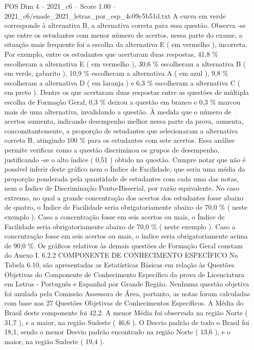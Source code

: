 \begin{textsample}{POS Dim 4 – 2021\_c6 – Score 1.00 – 2021\_c6/enade\_2021\_letras\_por\_esp\_4c09c5b51d.txt}
A curva em verde corresponde à alternativa B, a alternativa correta para essa questão.
Observa -se que entre os estudantes com menor número de acertos, nessa parte do exame, a situação mais frequente foi a escolha da alternativa E ( em vermelho ), incorreta.
Por exemplo, entre os estudantes que acertaram duas respostas, 41,8 \% escolheram a alternativa E ( em vermelho ), 30,6 \% escolheram a alternativa B ( em verde, gabarito ), 10,9 \% escolheram a alternativa A ( em azul ), 9,8 \% escolheram a alternativa D ( em laranja ) e 6,3 \% escolheram a alternativa C ( em preto ).
Dentre os que acertaram duas respostas entre as questões de múltipla escolha de Formação Geral, 0,3 \% deixou a questão em branco e 0,3 \% marcou mais de uma alternativa, invalidando a questão.
À medida que o número de acertos aumenta, indicando desempenho melhor nessa parte da prova, aumenta, concomitantemente, a proporção de estudantes que selecionaram a alternativa correta B, atingindo 100 \% para os estudantes com sete acertos.
Essa análise permite verificar como a questão discriminou os grupos de desempenho, justificando -se o alto índice ( 0,51 ) obtido na questão.
Cumpre notar que não é possível inferir deste gráfico nem o Índice de Facilidade, que seria uma média da proporção ponderada pela quantidade de estudantes com cada uma das notas, nem o Índice de Discriminação Ponto-Bisserial, por razão equivalente.
No caso extremo, no qual a grande concentração dos acertos dos estudantes fosse abaixo de quatro, o Índice de Facilidade seria obrigatoriamente abaixo de 70,0 \% ( neste exemplo ).
Caso a concentração fosse em seis acertos ou mais, o Índice de Facilidade seria obrigatoriamente abaixo de 70,0 \% ( neste exemplo ).
Caso a concentração fosse em seis acertos ou mais, o índice seria obrigatoriamente acima de 90,0 \%.
Os gráficos relativos às demais questões de Formação Geral constam do Anexo I. 6.2.2 COMPONENTE DE CONHECIMENTO ESPECÍFICO Na Tabela 6.10, são apresentadas as Estatísticas Básicas em relação às Questões Objetivas do Componente de Conhecimento Específico da prova de Licenciatura em Letras - Português e Espanhol por Grande Região.
Nenhuma questão objetiva foi anulada pela Comissão Assessora de Área, portanto, as notas foram calculadas com base nas 27 Questões Objetivas de Conhecimentos Específicos.
A Média do Brasil deste componente foi 42,2.
A menor Média foi observada na região Norte ( 31,7 ), e a maior, na região Sudeste ( 46,6 ).
O Desvio padrão de todo o Brasil foi 18,1, sendo o menor Desvio padrão encontrado na região Norte ( 13,6 ), e o maior, na região Sudeste ( 19,4 ).

\end{textsample}
